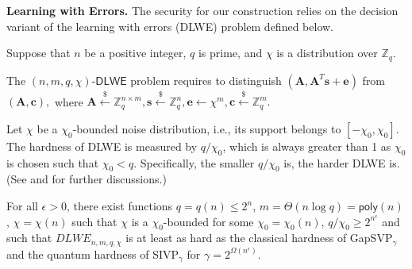 \documentclass[runningheads,10pt]{llncs}
\def\ZZ{\mathbb{Z}}
\def\cal{\mathcal}
\def\bf{\mathbf}
\def\u{\bf{u}}
\def\s{\bf{s}}
\begin{document}
\noindent\textbf{Learning with Errors.} 
The security for our construction relies on the decision variant of the learning with errors  (DLWE) problem defined below.
\begin{definition} \label{lwe}
	Suppose that $n$ be a positive integer, $q$ is prime, and $\chi$ is a distribution  over $\ZZ_q$. 
	\iffalse The $(n, m, q, \chi)$-$\mathsf{DLWE}$ problem requires to distinguish  $\cal{O}_\s$ and $\cal{O}_\$ $, where 
	\begin{enumerate}
		\item \underline{$\cal{O}_\s$}: $m$ pairs of the form $(\mathbf{a}_i, c_i):=(\mathbf{a}_i,\mathbf{a}_i^T\s+e_i)\in\ZZ_q^n\times\ZZ_q$, where $\s \xleftarrow{\$} \ZZ_q^n$  fixed, $\u_i \xleftarrow{\$}\ZZ_q^n$ and $e_i \gets \chi$ for $i\in [m]$.
		\item \underline{$\cal{O}_\$ $}: $m$ uniform pairs $(\mathbf{a}_i,c_i) \xleftarrow{\$} \ZZ_q^n\times\ZZ_q$.
	\end{enumerate}
	In other words, 
	\fi 
	The $(n, m, q, \chi)$-$\mathsf{DLWE}$ problem requires to distinguish 
	$(\mathbf{A}, \mathbf{A}^T\mathbf{s}+\mathbf{e})$ from $(\mathbf{A}, \mathbf{c}),$
	where  $\mathbf{A} \xleftarrow{\$}\ZZ_q^{n \times m} , \s \xleftarrow{\$} \ZZ_q^n, \mathbf{e}\gets \chi^m, \mathbf{c}\xleftarrow{\$} \ZZ_q^m.$ 
\end{definition}

Let $\chi$ be a $\chi_0$-bounded noise distribution, i.e.,  its support belongs to $[-\chi_0,\chi_0]$. 
The hardness of DLWE is measured by $q/\chi_0$, which is always greater than 1 as $\chi_0$ is chosen such that $\chi_0<q$. 
Specifically, the smaller $q/\chi_0$ is, the harder DLWE is. (See \cite[Subsection 2.2]{BGG+14} and \cite[Section 3]{BV16}  for further discussions.) 

\begin{lemma}[{\cite[Corollary 3.2]{BV16}}] \label{dlwehard}
For all $\epsilon>0$, there exist functions $q=q(n)\leq 2^n$, $m=\Theta(n\log q)=\mathsf{poly}(n)$, $\chi=\chi(n)$ such that $\chi$ is a $\chi_0$-bounded for some $\chi_0=\chi_0(n)$, $q/\chi_0 \geq 2^{n^\epsilon}$ and such that $DLWE_{n, m, q, \chi}$ is at least as hard as the classical hardness of GapSVP$_{\gamma}$ and the quantum hardness of SIVP$_\gamma$ for $\gamma=2^{\Omega(n^\epsilon)}$.
\end{lemma}
\end{document}
